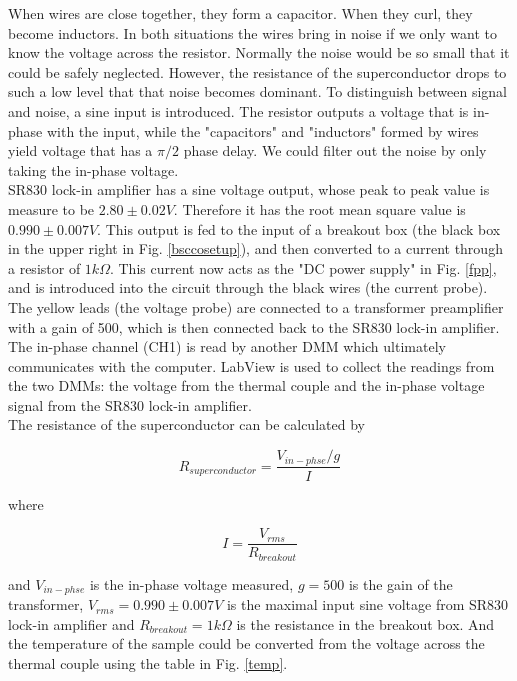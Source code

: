 \documentclass[prb,preprint]{revtex4-1}
\begin{document}
When wires are close together, they form a capacitor. When they curl, they become inductors. In both situations the wires bring in noise if we only want to know the voltage across the resistor. Normally the noise would be so small that it could be safely neglected. However, the resistance of the superconductor drops to such a low level that that noise becomes dominant. To distinguish between signal and noise, a sine input is introduced. The resistor outputs a voltage that is in-phase with the input, while the "capacitors" and "inductors" formed by wires yield voltage that has a $\pi/2$ phase delay. We could filter out the noise by only taking the in-phase voltage. \\

SR830 lock-in amplifier has a sine voltage output, whose peak to peak value is measure to be $2.80 \pm 0.02 V$. Therefore it has the root mean square value is $0.990\pm0.007V$. This output is fed to the input of a breakout box (the black box in the upper right in Fig. \ref{bsccosetup}), and then converted to a current through a resistor of $1k\Omega$. This current now acts as the "DC power supply" in Fig. \ref{fpp}, and is introduced into the circuit through the black wires (the current probe). The yellow leads (the voltage probe) are connected to a transformer preamplifier with a gain of 500, which is then connected back to the SR830 lock-in amplifier. The in-phase channel (CH1) is read by another DMM which ultimately communicates with the computer. LabView is used to collect the readings from the two DMMs: the voltage from the thermal couple and the in-phase voltage signal from the SR830 lock-in amplifier. \\

The resistance of the superconductor can be calculated by

\begin{equation}
R_{superconductor} = \frac{V_{in-phse}/g}{I}
\label{rofs}
\end{equation}

where

\begin{equation}
I=\frac{V_{rms}}{R_{breakout}}
\label{current}
\end{equation}

and $V_{in-phse}$ is the in-phase voltage measured, $g=500$ is the gain of the transformer, $V_{rms}=0.990\pm0.007V$ is the maximal input sine voltage from SR830 lock-in amplifier and $R_{breakout}=1k\Omega$ is the resistance in the breakout box. And the temperature of the sample could be converted from the voltage across the thermal couple using the table in Fig. \ref{temp}.\\
\end{document}
